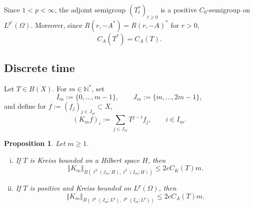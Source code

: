 \documentclass[12pt]{amsart}
\theoremstyle{plain}
\newtheorem{prop}[thm]{Proposition}
\theoremstyle{remark}
\theoremstyle{definition}
\newcommand{\N}{\mathbb{N}}
\newcommand{\norm}[1]{\left\Vert #1\right\Vert}
\begin{document}
	Since $1<p<\infty$, the adjoint semigroup $(T_t^*)_{t\ge0}$ is a positive
	$C_0$-semigroup on $L^{p'}(\Omega)$. Moreover, since
	$R(r,-A^*)=R(r,-A)^*$ for $r>0$,
	\begin{equation}\label{eqAdjointAbelContinuous}
		C_A(T^*)=C_A(T).
	\end{equation}
	
	\subsection{Discrete time}\label{secPrelimDiscrete}
	
	Let $T\in B(X)$. For $m\in\N^*$, set
	\[
	I_m:=\{0,\ldots,m-1\},
	\qquad
	J_m:=\{m,\ldots,2m-1\},
	\]
	and define for $ f := (f_j)_{j\in J_m} \subset X$,
	\begin{equation*}\label{eqDefKmDiscrete}
		(K_mf)_i
		:=
		\sum_{j\in J_m}T^{j-i}f_j,
		\qquad i\in I_m.
	\end{equation*}
	
	\begin{prop}\label{propTriangularDiscrete}
		Let $m\ge1$.
		
		\begin{enumerate}[(i)]
			\item
			If $T$ is Kreiss bounded on a Hilbert space $H$, then
			\begin{equation*}\label{eqTriangularDiscreteH}
				\norm{K_m}_{
					B(\ell^2(J_m;H),\ell^2(I_m;H))}
				\le
				2eC_K(T)m.
			\end{equation*}
			
			\item
			If $T$ is positive and Kreiss bounded on $L^p(\Omega)$, then
			\begin{equation*}\label{eqTriangularPositiveDiscrete}
				\norm{K_m}_{
					B(\ell^p(J_m;L^p),\ell^p(I_m;L^p))}
				\le
				2eC_A(T)m.
			\end{equation*}
		\end{enumerate}
	\end{prop}
	
\end{document}
